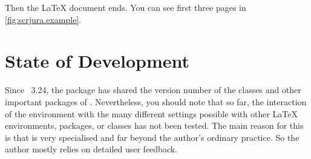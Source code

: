 %
Then the \LaTeX{} document ends. You can see first three pages in
\autoref{fig:scrjura.example}.%
%
\begin{figure}
  \setcapindent{0pt}%
  \label{fig:scrjura.example}
\end{figure}

\section{State of Development}

Since \KOMAScript~3.24, the  package has shared the version
number of the classes and other important packages of \KOMAScript.
Nevertheless, you should note that so far, the interaction of the
 environment with the many different settings
possible with other \LaTeX{} environments, packages, or classes has not been
tested. The main reason for this is that  is very specialised
and far beyond the author's ordinary practice. So the author mostly relies on
detailed user feedback.%
\EndIndexGroup

\endinput

